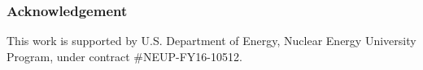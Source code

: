 \begin{frame}
\frametitle{Acknowledgement}
This work is supported by U.S. Department of Energy, 
Nuclear Energy University Program, under contract 
\#NEUP-FY16-10512. 
\end{frame}


